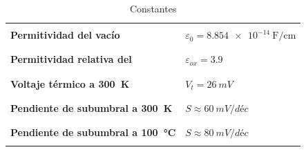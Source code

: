 \documentclass[10pt]{article}
\begin{document}
	\begin{table}
		\centering
		\begin{tabular}{|l|l|}
			\hline
			&\\
			\textbf{Permitividad del vacío} & $\varepsilon_0 = \SI{8.854e-14}{\farad\per\centi\meter}$ \\
			&\\
			\hline
			&\\
			\textbf{Permitividad relativa del \ch{SiO2}} & $\varepsilon_{ox} = \num{3.9}$ \\
			&\\
			\hline
			&\\
			\textbf{Voltaje térmico a \SI{300}{K}} & $V_t = \SI{26}{mV}$ \\
			&\\
			\hline
			&\\
			\textbf{Pendiente de subumbral a \SI{300}{K}} & $S \approx \SI{60}{mV/déc}$ \\
			&\\
			\hline
			&\\
			\textbf{Pendiente de subumbral a \SI{100}{\celsius}} & $S \approx \SI{80}{mV/déc}$ \\
			&\\
			\hline
		\end{tabular}
		\caption{Constantes}
	\end{table}
\end{document}
